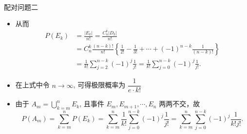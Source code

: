 \begin{frame}{配对问题二}


	\begin{itemize}[<+-|alert@+>]

		\item 从而
		      \begin{align*}
			      P(E_k) & =\frac{|E_k|}{n!}=\frac{C_n^k|D_k|}{n!}                                                           \\
			             & =C_n^k\frac{(n-k)!}{n!}\left\{\frac{1}{2!}-\frac{1}{3!}+\cdots+(-1)^{n-k}\frac{1}{(n-k)!}\right\} \\    				&=\frac{1}{k!}\sum_{j=2}^{n-k}(-1)^j\frac{1}{j!}=\frac{1}{k!}\sum_{j=0}^{n-k}(-1)^j\frac{1}{j!}.
		      \end{align*}
		\item 在上式中令 $n\rightarrow\infty$, 可得极限概率为 $\dfrac{1}{e\cdot k!}$
		\item 由于 $A_m=\bigcup\limits_{k=m}^{n} E_k$, 且事件 $E_m,E_{m+1},\cdots,E_n$ 两两不交，故
		      $$P(A_m)=\sum_{k=m}^{n}P(E_k)=\sum_{k=m}^{n}\frac{1}{k!}\sum_{j=0}^{n-k}(-1)^j\frac{1}{j!}=\sum_{k=m}^{n}\sum_{j=0}^{n-k}(-1)^j\frac{1}{k!j!}.$$
	\end{itemize}

\end{frame}





